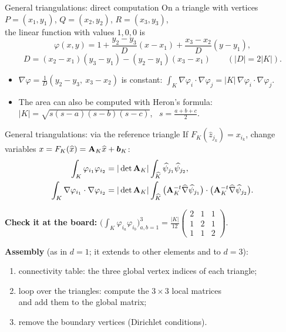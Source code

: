 \begin{frame}{General triangulations: direct computation}
    On a triangle with vertices $P = (x_1,y_1)$, $Q = (x_2,y_2)$, $R = (x_3, y_3)$,\\ the linear function with values $1, 0, 0$ is
    \[
        \varphi(x,y) = 1 + \frac{y_2 - y_3}{D}(x - x_1) + \frac{x_3 - x_2}{D}(y - y_1),
    \]
    \[
        D = (x_2 - x_1)(y_3 - y_1) - (y_2 - y_1)(x_3 - x_1) \qquad (|D| = 2|K|).
    \]
    \begin{itemize}
        \item $\nabla\varphi = \frac{1}{D}(y_2 - y_3,\ x_3 - x_2)$ is constant: $\int_K \nabla\varphi_i\cdot\nabla\varphi_j = |K|\, \nabla\varphi_i\cdot\nabla\varphi_j$.
        \item The area can also be computed with Heron's formula:
              $|K| = \sqrt{s(s-a)(s-b)(s-c)}$, \ $s = \frac{a+b+c}{2}$.
    \end{itemize}
\end{frame}

\begin{frame}{General triangulations: via the reference triangle}
    \small
    If $F_K(\widehat z_{j_k}) = x_{i_k}$, change variables $x = F_K(\widehat x) = \mathbf{A}_K \widehat x + \bm{b}_K$:
    \begin{align*}
        \int_K \varphi_{i_1}\varphi_{i_2}                  & = |\det \mathbf{A}_K| \int_{\widehat K} \widehat\psi_{j_1}\widehat\psi_{j_2},                                                                                \\
        \int_K \nabla\varphi_{i_1}\cdot\nabla\varphi_{i_2} & = |\det \mathbf{A}_K| \int_{\widehat K} \big(\mathbf{A}_K^{-t}\widehat\nabla\widehat\psi_{j_1}\big)\cdot\big(\mathbf{A}_K^{-t}\widehat\nabla\widehat\psi_{j_2}\big).
    \end{align*}
    \begin{example}
        \textcolor{mnuaccent}{\textbf{Check it at the board:}} \quad
        $\Big(\int_{K}\varphi_{i_a}\varphi_{i_b}\Big)_{a,b=1}^3 = \frac{|K|}{12}\left(\begin{smallmatrix} 2 & 1 & 1 \\ 1 & 2 & 1 \\ 1 & 1 & 2 \end{smallmatrix}\right).$
    \end{example}
    \textbf{Assembly} (as in $d=1$; it extends to other elements and to $d = 3$):
    \begin{enumerate}
        \item connectivity table: the three global vertex indices of each triangle;
        \item loop over the triangles: compute the $3\times3$ local matrices\\ and add them to the global matrix;
        \item remove the boundary vertices (Dirichlet conditions).
    \end{enumerate}
\end{frame}

